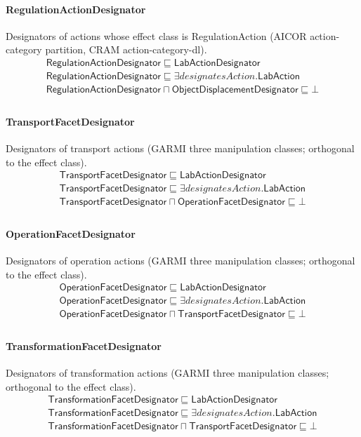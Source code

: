 \documentclass[10pt]{article}
\begin{document}
\paragraph{RegulationActionDesignator} Designators of actions whose effect class is RegulationAction (AICOR action-category partition, CRAM action-category-dl).
\[\begin{array}{l}
\mathsf{RegulationActionDesignator} \sqsubseteq  \mathsf{LabActionDesignator} \\
\mathsf{RegulationActionDesignator} \sqsubseteq  \exists \mathit{designatesAction}.\mathsf{LabAction} \\
\mathsf{RegulationActionDesignator} \sqcap  \mathsf{ObjectDisplacementDesignator} \sqsubseteq  \bot  \\
\end{array}\]
\paragraph{TransportFacetDesignator} Designators of transport actions (GARMI three manipulation classes; orthogonal to the effect class).
\[\begin{array}{l}
\mathsf{TransportFacetDesignator} \sqsubseteq  \mathsf{LabActionDesignator} \\
\mathsf{TransportFacetDesignator} \sqsubseteq  \exists \mathit{designatesAction}.\mathsf{LabAction} \\
\mathsf{TransportFacetDesignator} \sqcap  \mathsf{OperationFacetDesignator} \sqsubseteq  \bot  \\
\end{array}\]
\paragraph{OperationFacetDesignator} Designators of operation actions (GARMI three manipulation classes; orthogonal to the effect class).
\[\begin{array}{l}
\mathsf{OperationFacetDesignator} \sqsubseteq  \mathsf{LabActionDesignator} \\
\mathsf{OperationFacetDesignator} \sqsubseteq  \exists \mathit{designatesAction}.\mathsf{LabAction} \\
\mathsf{OperationFacetDesignator} \sqcap  \mathsf{TransportFacetDesignator} \sqsubseteq  \bot  \\
\end{array}\]
\paragraph{TransformationFacetDesignator} Designators of transformation actions (GARMI three manipulation classes; orthogonal to the effect class).
\[\begin{array}{l}
\mathsf{TransformationFacetDesignator} \sqsubseteq  \mathsf{LabActionDesignator} \\
\mathsf{TransformationFacetDesignator} \sqsubseteq  \exists \mathit{designatesAction}.\mathsf{LabAction} \\
\mathsf{TransformationFacetDesignator} \sqcap  \mathsf{TransportFacetDesignator} \sqsubseteq  \bot  \\
\end{array}\]
\end{document}
